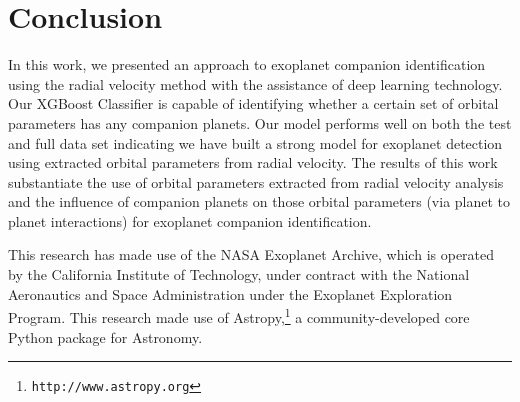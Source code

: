 \documentclass[12pt]{article}
\begin{document}
\section{Conclusion}
\label{sec:conclusion}
In this work, we presented an approach to exoplanet companion identification using the radial velocity method with the assistance of deep learning technology. Our XGBoost Classifier is capable of identifying whether a certain set of orbital parameters has any companion planets. Our model performs well on both the test and full data set indicating we have built a strong model for exoplanet detection using extracted orbital parameters from radial velocity. The results of this work substantiate the use of orbital parameters extracted from radial velocity analysis and the influence of companion planets on those orbital parameters (via planet to planet interactions) for exoplanet companion identification. 
\par
This research has made use of the NASA Exoplanet Archive, which is operated by the California Institute of Technology, under contract with the National Aeronautics and Space Administration under the Exoplanet Exploration Program. This research made use of Astropy,\footnote{\texttt{http://www.astropy.org}} a community-developed core Python package for Astronomy.



\end{document}
